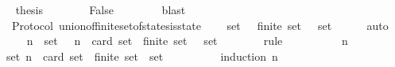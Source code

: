 \begin{isabellebody}
\ \isamarkupfalse%
\ {\isacharquery}thesis\isanewline
\ \ \ \ \ \ \isamarkupfalse%
\ False\ {\isacartoucheopen}{\isasymsigma}{}\ {\isasymin}\ {\isasymSigma}{\isacartoucheclose}\ {\isacartoucheopen}{\isasymsigma}{}\ {\isasymin}\ {\isasymSigma}{\isacartoucheclose}\ \isamarkupfalse%
\ blast\isanewline
\ \ \isamarkupfalse%
\isanewline
{}\isamarkupfalse%
%
\endisatagproof
{\isafoldproof}%
%
\isadelimproof
\isanewline
%
\endisadelimproof
\isanewline
\isanewline
{}\isamarkupfalse%
\ {\isacharparenleft}\ Protocol{\isacharparenright}\ union{\isacharunderscore}of{\isacharunderscore}finite{\isacharunderscore}set{\isacharunderscore}of{\isacharunderscore}states{\isacharunderscore}is{\isacharunderscore}state\ {\isacharcolon}\isanewline
\ \ {\isachardoublequoteopen}{\isasymforall}\ {\isasymsigma}{\isacharunderscore}set\ {\isasymsubseteq}\ {\isasymSigma}{\isachardot}\ finite\ {\isasymsigma}{\isacharunderscore}set\ {\isasymlongrightarrow}\ {\isasymUnion}\ {\isasymsigma}{\isacharunderscore}set\ {\isasymin}\ {\isasymSigma}{\isachardoublequoteclose}\isanewline
%
\isadelimproof
\ \ %
\endisadelimproof
%
\isatagproof
{}\isamarkupfalse%
\ auto\isanewline
{}\isamarkupfalse%
\ {\isacharminus}\isanewline
\ \ \isamarkupfalse%
\ {\isachardoublequoteopen}{\isasymforall}\ n{\isachardot}\ {\isasymforall}\ {\isasymsigma}{\isacharunderscore}set\ {\isasymsubseteq}\ {\isasymSigma}{\isachardot}\ n\ {\isacharequal}\ card\ {\isasymsigma}{\isacharunderscore}set\ {\isasymlongrightarrow}\ finite\ {\isasymsigma}{\isacharunderscore}set\ {\isasymlongrightarrow}\ {\isasymUnion}\ {\isasymsigma}{\isacharunderscore}set\ {\isasymin}\ {\isasymSigma}{\isachardoublequoteclose}\isanewline
\ \ \ \ \isamarkupfalse%
\ {\isacharparenleft}rule{\isacharparenright}\isanewline
\ \ \isamarkupfalse%
\ {\isacharminus}\isanewline
\ \ \ \ \isamarkupfalse%
\ n\isanewline
\ \ \ \ \isamarkupfalse%
\ {\isachardoublequoteopen}{\isasymforall}{\isasymsigma}{\isacharunderscore}set{\isasymsubseteq}{\isasymSigma}{\isachardot}\ n\ {\isacharequal}\ card\ {\isasymsigma}{\isacharunderscore}set\ {\isasymlongrightarrow}\ finite\ {\isasymsigma}{\isacharunderscore}set\ {\isasymlongrightarrow}\ {\isasymUnion}{\isasymsigma}{\isacharunderscore}set\ {\isasymin}\ {\isasymSigma}{\isachardoublequoteclose}\isanewline
\ \ \ \ \ \ \isamarkupfalse%
\ {\isacharparenleft}induction\ n{\isacharparenright}\isanewline

\end{isabellebody}
